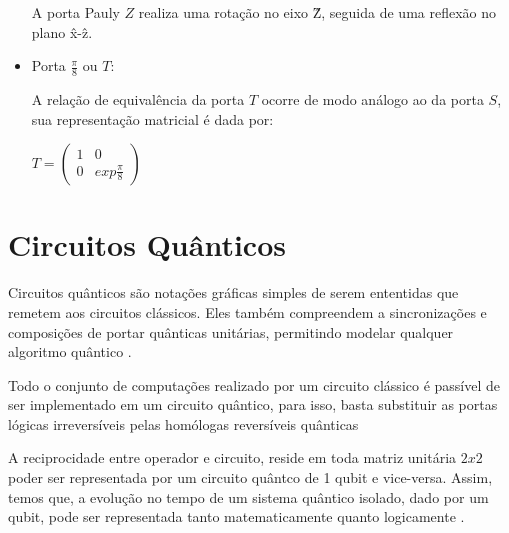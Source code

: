 \documentclass[tcc,capa]{texufpel}
\begin{document}
\begin{itemize}
A porta Pauly $Z$ realiza uma rotação no eixo \^{Z}, seguida de uma reflexão no plano \^{x}-\^{z}. 


\item \begin{center}
    
 Porta $\frac{\pi}{8}$ ou $T$: \cite{chuang00a}
\end{center}

A relação de equivalência da porta $T$ ocorre de modo análogo ao da porta $S$, sua representação matricial é dada por: 

\begin{center}
    
 $T= \left( \begin{array}{cc}
    1 & 0 \\
    0 & exp\frac{\pi}{8}
\end{array}
\right)
$
\end{center}

\end{itemize}


\section{Circuitos Quânticos}
Circuitos quânticos são notações gráficas simples de serem ententidas que remetem aos circuitos clássicos. Eles também compreendem a sincronizações e composições de portar quânticas unitárias, permitindo modelar qualquer algoritmo quântico \cite{MARON10b}.

Todo o conjunto de computações realizado por um circuito clássico é passível de ser implementado em um circuito quântico, para isso, basta substituir as portas lógicas irreversíveis pelas homólogas reversíveis quânticas \cite{portugal2004introduccaoa}

A reciprocidade entre operador e circuito, reside em toda matriz unitária $2 x 2$ poder ser representada por um circuito quântco de 1 qubit e vice-versa. Assim, temos que, a evolução no tempo de um sistema quântico isolado, dado por um qubit, pode ser representada tanto matematicamente quanto logicamente \cite{imre2005quantum}.
\end{document}
